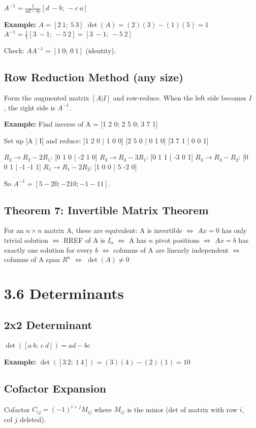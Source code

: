 $A^{-1} = \frac{1}{ad-bc} [d\ -b;\ -c\ a]$

\textbf{Example:} $A = [2\ 1;\ 5\ 3]$
$\det(A) = (2)(3)-(1)(5) = 1$
$A^{-1} = \frac{1}{1}[3\ -1;\ -5\ 2] = [3\ -1;\ -5\ 2]$

Check: $AA^{-1} = [1\ 0;\ 0\ 1]$ (identity).

\subsection{Row Reduction Method (any size)}
Form the augmented matrix $[A | I]$ and row-reduce.
When the left side becomes $I$, the right side is $A^{-1}$.

\textbf{Example:} Find inverse of A = [1 2 0; 2 5 0; 3 7 1]

Set up [A | I] and reduce:
[1 2 0 | 1 0 0]
[2 5 0 | 0 1 0]
[3 7 1 | 0 0 1]

$R_2 \to R_2 - 2R_1$: [0 1 0 | -2 1 0]
$R_3 \to R_3 - 3R_1$: [0 1 1 | -3 0 1]
$R_3 \to R_3 - R_2$: [0 0 1 | -1 -1 1]
$R_1 \to R_1 - 2R_2$: [1 0 0 | 5 -2 0]

So $A^{-1} = [5 -2 0; -2 1 0; -1 -1 1]$.

\subsection{Theorem 7: Invertible Matrix Theorem}
For an $n \times n$ matrix A, these are equivalent:
A is invertible $\Leftrightarrow$ $Ax = 0$ has only trivial solution
$\Leftrightarrow$ RREF of A is $I_n$
$\Leftrightarrow$ A has $n$ pivot positions
$\Leftrightarrow$ $Ax = b$ has exactly one solution for every $b$
$\Leftrightarrow$ columns of A are linearly independent
$\Leftrightarrow$ columns of A span $R^n$
$\Leftrightarrow$ $\det(A) \neq 0$

\section{3.6 Determinants}

\subsection{2x2 Determinant}
$\det([a\ b;\ c\ d]) = ad - bc$

\textbf{Example:} $\det([3\ 2;\ 1\ 4]) = (3)(4)-(2)(1) = 10$

\subsection{Cofactor Expansion}
Cofactor $C_{ij} = (-1)^{i+j} M_{ij}$
where $M_{ij}$ is the minor (det of matrix with row $i$, col $j$ deleted).

